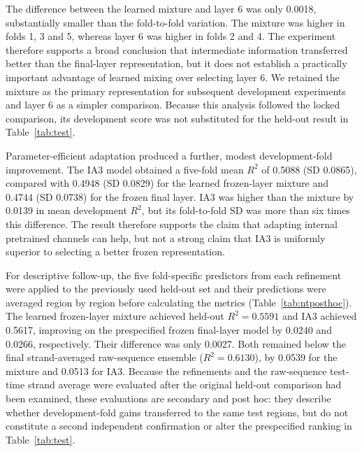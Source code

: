 \documentclass[a4paper,12pt]{article}
\begin{document}
The difference between the learned mixture and layer 6 was only 0.0018, substantially smaller than the fold-to-fold variation. The mixture was higher in folds 1, 3 and 5, whereas layer 6 was higher in folds 2 and 4. The experiment therefore supports a broad conclusion that intermediate information transferred better than the final-layer representation, but it does not establish a practically important advantage of learned mixing over selecting layer 6. We retained the mixture as the primary representation for subsequent development experiments and layer 6 as a simpler comparison. Because this analysis followed the locked comparison, its development score was not substituted for the held-out result in Table~\ref{tab:test}.

Parameter-efficient adaptation produced a further, modest development-fold improvement. The IA3 model obtained a five-fold mean $R^2$ of 0.5088 (SD 0.0865), compared with 0.4948 (SD 0.0829) for the learned frozen-layer mixture and 0.4744 (SD 0.0738) for the frozen final layer. IA3 was higher than the mixture by 0.0139 in mean development $R^2$, but its fold-to-fold SD was more than six times this difference. The result therefore supports the claim that adapting internal pretrained channels can help, but not a strong claim that IA3 is uniformly superior to selecting a better frozen representation.

For descriptive follow-up, the five fold-specific predictors from each refinement were applied to the previously used held-out set and their predictions were averaged region by region before calculating the metrics (Table~\ref{tab:ntposthoc}). The learned frozen-layer mixture achieved held-out $R^2=0.5591$ and IA3 achieved 0.5617, improving on the prespecified frozen final-layer model by 0.0240 and 0.0266, respectively. Their difference was only 0.0027. Both remained below the final strand-averaged raw-sequence ensemble ($R^2=0.6130$), by 0.0539 for the mixture and 0.0513 for IA3. Because the refinements and the raw-sequence test-time strand average were evaluated after the original held-out comparison had been examined, these evaluations are secondary and post hoc: they describe whether development-fold gains transferred to the same test regions, but do not constitute a second independent confirmation or alter the prespecified ranking in Table~\ref{tab:test}.
\end{document}
